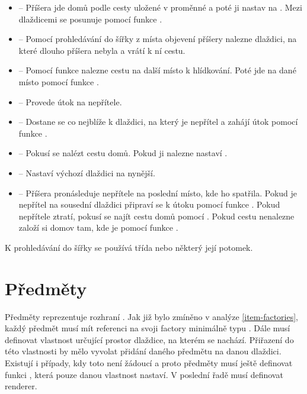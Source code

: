 \begin{itemize}
\item {} -- Příšera jde domů podle cesty uložené v proměnné  a poté ji nastav na . 
         Mezi dlaždicemi se posunuje pomocí funkce .

\item {} -- Pomocí prohledávání do šířky z místa objevení příšery nalezne dlaždici, na které dlouho
příšera nebyla a vrátí k ní cestu.

\item {} -- Pomocí funkce  nalezne cestu na další místo k hlídkování. Poté jde na dané místo
 pomocí funkce .

\item {} -- Provede útok na nepřítele.

\item {} -- Dostane se co nejblíže k dlaždici, na který je nepřítel a zahájí útok pomocí funkce .

\item {} -- Pokusí se nalézt cestu domů. Pokud ji nalezne nastaví .

\item {} -- Nastaví výchozí dlaždici na nynější.

\item {} -- Příšera pronásleduje nepřítele na poslední místo, kde ho spatřila. Pokud je nepřítel na sousední dlaždici připraví
se k útoku pomocí funkce . Pokud nepřítele ztratí, pokusí se najít cestu domů pomocí . Pokud
cestu nenalezne založí si domov tam, kde je pomocí funkce .

\end{itemize}

K prohledávání do šířky se používá třída  nebo některý její potomek. 

\section{Předměty}
Předměty reprezentuje rozhraní . Jak již bylo zmíněno v analýze \vref{item-factories}, každý předmět musí mít referenci na svoji 
factory minimálně typu . Dále musí definovat vlastnost  určující prostor dlaždice, na kterém se nachází. 
Přiřazení do této vlastnosti by mělo vyvolat přidání daného předmětu na danou dlaždici. Existují i případy, kdy toto není 
žádoucí a proto předměty musí ještě definovat funkci , která pouze danou vlastnost nastaví. V poslední řadě musí definovat renderer.


